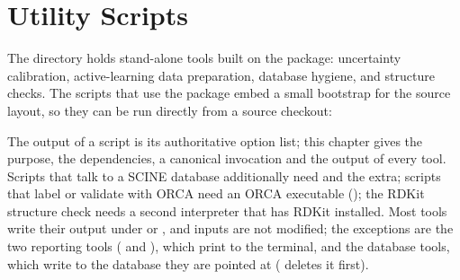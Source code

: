\chapter{Utility Scripts}
\label{ch:scripts}

The  directory holds stand-alone tools built on the
 package: uncertainty calibration, active-learning data
preparation, database hygiene, and structure checks.  The scripts that use
the package embed a small  bootstrap for the source layout, so
they can be run directly from a source checkout:


The  output of a script is its authoritative option list; this
chapter gives the purpose, the dependencies, a canonical invocation and the
output of every tool.  Scripts that talk to a SCINE database additionally
need  and the \code{[scine]} extra; scripts that label or
validate with ORCA need an ORCA executable (); the RDKit
structure check needs a second interpreter that has RDKit installed.
Most tools write their output under  or , and
inputs are not modified; the exceptions are the two reporting tools
( and ), which print to the
terminal, and the database tools, which write to the database they are
pointed at ( deletes it first).

